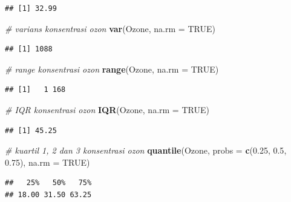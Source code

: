 \documentclass[]{book}
\newenvironment{Shaded}{\begin{snugshade}}{\end{snugshade}}
\newcommand{\CommentTok}[1]{\textcolor[rgb]{0.56,0.35,0.01}{\textit{#1}}}
\newcommand{\DataTypeTok}[1]{\textcolor[rgb]{0.13,0.29,0.53}{#1}}
\newcommand{\FloatTok}[1]{\textcolor[rgb]{0.00,0.00,0.81}{#1}}
\newcommand{\KeywordTok}[1]{\textcolor[rgb]{0.13,0.29,0.53}{\textbf{#1}}}
\newcommand{\NormalTok}[1]{#1}
\newcommand{\OtherTok}[1]{\textcolor[rgb]{0.56,0.35,0.01}{#1}}
\theoremstyle{definition}
\theoremstyle{definition}
\theoremstyle{definition}
\theoremstyle{remark}
\begin{document}
\begin{verbatim}
## [1] 32.99
\end{verbatim}

\begin{Shaded}
\begin{Highlighting}[]
\CommentTok{# varians konsentrasi ozon}
\KeywordTok{var}\NormalTok{(Ozone, }\DataTypeTok{na.rm =} \OtherTok{TRUE}\NormalTok{)}
\end{Highlighting}
\end{Shaded}

\begin{verbatim}
## [1] 1088
\end{verbatim}

\begin{Shaded}
\begin{Highlighting}[]
\CommentTok{# range konsentrasi ozon}
\KeywordTok{range}\NormalTok{(Ozone, }\DataTypeTok{na.rm =} \OtherTok{TRUE}\NormalTok{)}
\end{Highlighting}
\end{Shaded}

\begin{verbatim}
## [1]   1 168
\end{verbatim}

\begin{Shaded}
\begin{Highlighting}[]
\CommentTok{# IQR konsentrasi ozon}
\KeywordTok{IQR}\NormalTok{(Ozone, }\DataTypeTok{na.rm =} \OtherTok{TRUE}\NormalTok{)}
\end{Highlighting}
\end{Shaded}

\begin{verbatim}
## [1] 45.25
\end{verbatim}

\begin{Shaded}
\begin{Highlighting}[]
\CommentTok{# kuartil 1, 2 dan 3 konsentrasi ozon}
\KeywordTok{quantile}\NormalTok{(Ozone, }\DataTypeTok{probs =} \KeywordTok{c}\NormalTok{(}\FloatTok{0.25}\NormalTok{, }\FloatTok{0.5}\NormalTok{, }\FloatTok{0.75}\NormalTok{), }\DataTypeTok{na.rm =} \OtherTok{TRUE}\NormalTok{)}
\end{Highlighting}
\end{Shaded}

\begin{verbatim}
##   25%   50%   75% 
## 18.00 31.50 63.25
\end{verbatim}
\end{document}
